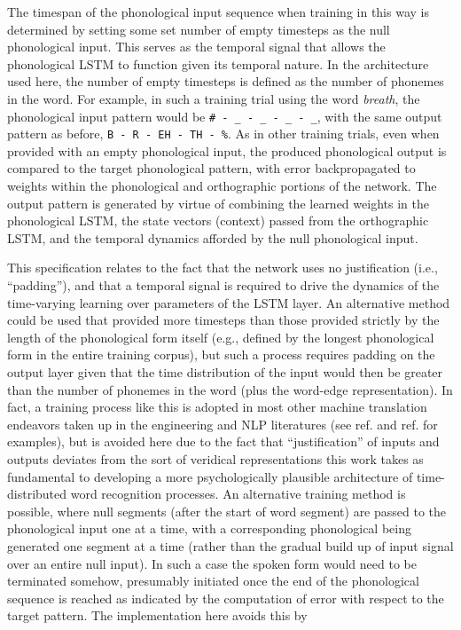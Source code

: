 \documentclass[
  american,
  ,man,floatsintext]{apa6}
\begin{document}
The timespan of the phonological input sequence when training in this way is determined by setting some set number of empty timesteps as the null phonological input. This serves as the temporal signal that allows the phonological LSTM to function given its temporal nature. In the architecture used here, the number of empty timesteps is defined as the number of phonemes in the word. For example, in such a training trial using the word \emph{breath}, the phonological input pattern would be \texttt{\#\ -\ \_\ -\ \_\ -\ \_\ -\ \_}, with the same output pattern as before, \texttt{B\ -\ R\ -\ EH\ -\ TH\ -\ \%}. As in other training trials, even when provided with an empty phonological input, the produced phonological output is compared to the target phonological pattern, with error backpropagated to weights within the phonological and orthographic portions of the network. The output pattern is generated by virtue of combining the learned weights in the phonological LSTM, the state vectors (context) passed from the orthographic LSTM, and the temporal dynamics afforded by the null phonological input.

This specification relates to the fact that the network uses no justification (i.e., ``padding''), and that a temporal signal is required to drive the dynamics of the time-varying learning over parameters of the LSTM layer. An alternative method could be used that provided more timesteps than those provided strictly by the length of the phonological form itself (e.g., defined by the longest phonological form in the entire training corpus), but such a process requires padding on the output layer given that the time distribution of the input would then be greater than the number of phonemes in the word (plus the word-edge representation). In fact, a training process like this is adopted in most other machine translation endeavors taken up in the engineering and NLP literatures (see ref. and ref. for examples), but is avoided here due to the fact that ``justification'' of inputs and outputs deviates from the sort of veridical representations this work takes as fundamental to developing a more psychologically plausible architecture of time-distributed word recognition processes. An alternative training method is possible, where null segments (after the start of word segment) are passed to the phonological input one at a time, with a corresponding phonological being generated one segment at a time (rather than the gradual build up of input signal over an entire null input). In such a case the spoken form would need to be terminated somehow, presumably initiated once the end of the phonological sequence is reached as indicated by the computation of error with respect to the target pattern. The implementation here avoids this by
\end{document}
